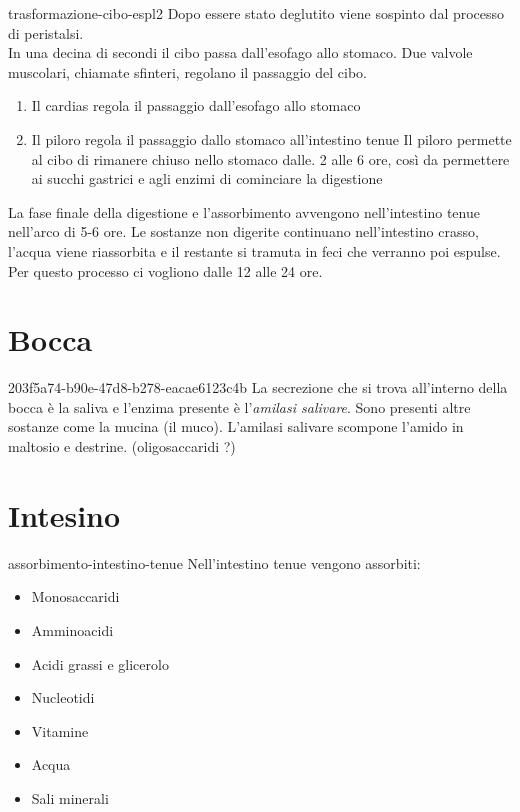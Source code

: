 \documentclass[preview]{standalone}
\begin{document}
\begin{snippet}{trasformazione-cibo-espl2}
    Dopo essere stato deglutito viene sospinto dal
    processo di peristalsi.
    \\
    In una decina di secondi il cibo passa dall'esofago allo stomaco. Due
    valvole muscolari, chiamate sfinteri, regolano il passaggio del cibo.
    
    \begin{enumerate}
        \item Il cardias regola il passaggio dall'esofago allo stomaco
        \item Il piloro regola il passaggio dallo stomaco all'intestino tenue
        Il piloro permette al cibo di rimanere chiuso nello stomaco dalle.
        2 alle 6 ore, così da permettere ai succhi gastrici e agli enzimi
        di cominciare la digestione
    \end{enumerate}
    
    La fase finale della digestione e l'assorbimento avvengono
    nell'intestino tenue nell'arco di 5-6 ore. Le sostanze non digerite
    continuano nell'intestino crasso, l'acqua viene riassorbita e il restante
    si tramuta in feci che verranno poi espulse. Per questo processo ci
    vogliono dalle 12 alle 24 ore.
\end{snippet}

\section{Bocca}

\begin{snippet}{203f5a74-b90e-47d8-b278-eacae6123c4b}
    La secrezione che si trova all'interno della bocca è la saliva e l'enzima
    presente è l'\textit{amilasi salivare}.
    Sono presenti altre sostanze come la mucina (il muco).
    L'amilasi salivare scompone l'amido in maltosio e destrine. (oligosaccaridi ?)
\end{snippet}


\section{Intesino}


\begin{snippet}{assorbimento-intestino-tenue}
    Nell'intestino tenue vengono assorbiti:
    \begin{itemize}
       \item Monosaccaridi
       \item Amminoacidi
       \item Acidi grassi e glicerolo
       \item Nucleotidi
       \item Vitamine
       \item Acqua
       \item Sali minerali
    \end{itemize}
\end{snippet}
\end{document}
